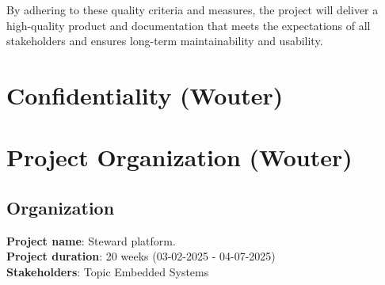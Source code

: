 \documentclass{article}
\begin{document}
By adhering to these quality criteria and measures, the project will deliver a high-quality product and documentation that meets the expectations of all stakeholders and ensures long-term maintainability and usability.

\newpage

\section{Confidentiality (Wouter)}


\newpage

\section{Project Organization (Wouter)}


\subsection{Organization}
\textbf{Project name}: Steward platform.\\ 
\textbf{Project duration}: 20 weeks (03-02-2025 - 04-07-2025)\\ 
\textbf{Stakeholders}: Topic Embedded Systems
\end{document}
